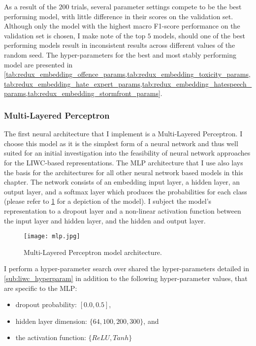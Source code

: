 As a result of the $200$ trials, several parameter settings compete to be the best performing model, with little difference in their scores on the validation set. Although only the model with the highest macro F1-score performance on the validation set is chosen, I make note of the top $5$ models, should one of the best performing models result in inconsistent results across different values of the random seed. The hyper-parameters for the best and most stably performing model are presented in \cref{tab:redux_embedding_offence_params,tab:redux_embedding_toxicity_params,tab:redux_embedding_hate_expert_params,tab:redux_embedding_hatespeech_params,tab:redux_embedding_stormfront_params}.

\subsubsection{Multi-Layered Perceptron}

The first neural architecture that I implement is a Multi-Layered Perceptron. I choose this model as it is the simplest form of a neural network and thus well suited for an initial investigation into the feasibility of neural network approaches for the LIWC-based representations. The MLP architecture that I use also lays the basis for the architectures for all other neural network based models in this chapter. The network consists of an embedding input layer, a hidden layer, an output layer, and a softmax layer which produces the probabilities for each class (please refer to \cref{fig:liwc_mlp} for a depiction of the model). I subject the model's representation to a dropout layer and a non-linear activation function between the input layer and hidden layer, and the hidden and output layer.

\begin{figure}
  \centering
  \texttt{[image: mlp.jpg]}
  \caption{Multi-Layered Perceptron model architecture.}
  \label{fig:liwc_mlp}
\end{figure}

I perform a hyper-parameter search over shared the hyper-parameters detailed in \cref{sub:liwc_hyperparam} in addition to the following hyper-parameter values, that are specific to the MLP:

\begin{itemize}
  \item dropout probability: $[0.0, 0.5]$,
  \item hidden layer dimension: $\{64, 100, 200, 300\}$, and
  \item the activation function: $\{ReLU, Tanh\}$
\end{itemize}

